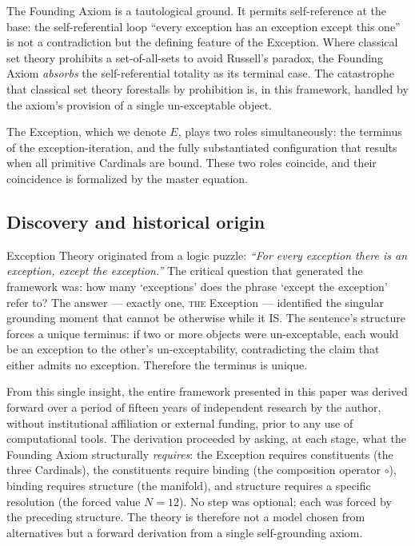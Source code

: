 \documentclass[11pt,a4paper]{article}
\theoremstyle{definition}
\theoremstyle{remark}
\begin{document}
The Founding Axiom is a tautological ground. It permits self-reference at the base: the self-referential loop ``every exception has an exception except this one'' is not a contradiction but the defining feature of the Exception. Where classical set theory prohibits a set-of-all-sets to avoid Russell's paradox, the Founding Axiom \emph{absorbs} the self-referential totality as its terminal case. The catastrophe that classical set theory forestalls by prohibition is, in this framework, handled by the axiom's provision of a single un-exceptable object.

The Exception, which we denote $E$, plays two roles simultaneously: the terminus of the exception-iteration, and the fully substantiated configuration that results when all primitive Cardinals are bound. These two roles coincide, and their coincidence is formalized by the master equation.

\subsection{Discovery and historical origin}\label{subsec:origin}

Exception Theory originated from a logic puzzle: \emph{``For every exception there is an exception, except the exception.''} The critical question that generated the framework was: how many `exceptions' does the phrase `except the exception' refer to? The answer --- exactly one, \textsc{the} Exception --- identified the singular grounding moment that cannot be otherwise while it IS. The sentence's structure forces a unique terminus: if two or more objects were un-exceptable, each would be an exception to the other's un-exceptability, contradicting the claim that either admits no exception. Therefore the terminus is unique.

From this single insight, the entire framework presented in this paper was derived forward over a period of fifteen years of independent research by the author, without institutional affiliation or external funding, prior to any use of computational tools. The derivation proceeded by asking, at each stage, what the Founding Axiom structurally \emph{requires}: the Exception requires constituents (the three Cardinals), the constituents require binding (the composition operator $\circ$), binding requires structure (the manifold), and structure requires a specific resolution (the forced value $N = 12$). No step was optional; each was forced by the preceding structure. The theory is therefore not a model chosen from alternatives but a forward derivation from a single self-grounding axiom.
\end{document}
